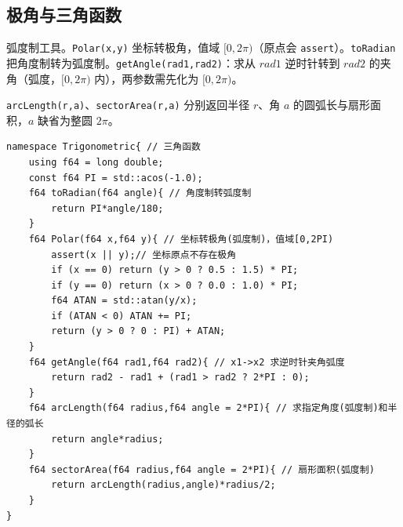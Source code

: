 \subsection{极角与三角函数}

弧度制工具。\verb|Polar(x,y)| 坐标转极角，值域 $[0,2\pi)$（原点会 \texttt{assert}）。\verb|toRadian| 把角度制转为弧度制。\verb|getAngle(rad1,rad2)|：求从 $rad1$ 逆时针转到 $rad2$ 的夹角（弧度，$[0,2\pi)$ 内），两参数需先化为 $[0,2\pi)$。

\verb|arcLength(r,a)|、\verb|sectorArea(r,a)| 分别返回半径 $r$、角 $a$ 的圆弧长与扇形面积，$a$ 缺省为整圆 $2\pi$。

\begin{lstlisting}
namespace Trigonometric{ // 三角函数
    using f64 = long double;
    const f64 PI = std::acos(-1.0);
    f64 toRadian(f64 angle){ // 角度制转弧度制
        return PI*angle/180;
    }
    f64 Polar(f64 x,f64 y){ // 坐标转极角(弧度制)，值域[0,2PI)
        assert(x || y);// 坐标原点不存在极角
        if (x == 0) return (y > 0 ? 0.5 : 1.5) * PI;
        if (y == 0) return (x > 0 ? 0.0 : 1.0) * PI;
        f64 ATAN = std::atan(y/x);
        if (ATAN < 0) ATAN += PI;
        return (y > 0 ? 0 : PI) + ATAN;
    }
    f64 getAngle(f64 rad1,f64 rad2){ // x1->x2 求逆时针夹角弧度
        return rad2 - rad1 + (rad1 > rad2 ? 2*PI : 0);
    }
    f64 arcLength(f64 radius,f64 angle = 2*PI){ // 求指定角度(弧度制)和半径的弧长
        return angle*radius;
    }
    f64 sectorArea(f64 radius,f64 angle = 2*PI){ // 扇形面积(弧度制)
        return arcLength(radius,angle)*radius/2;
    }
}
\end{lstlisting}